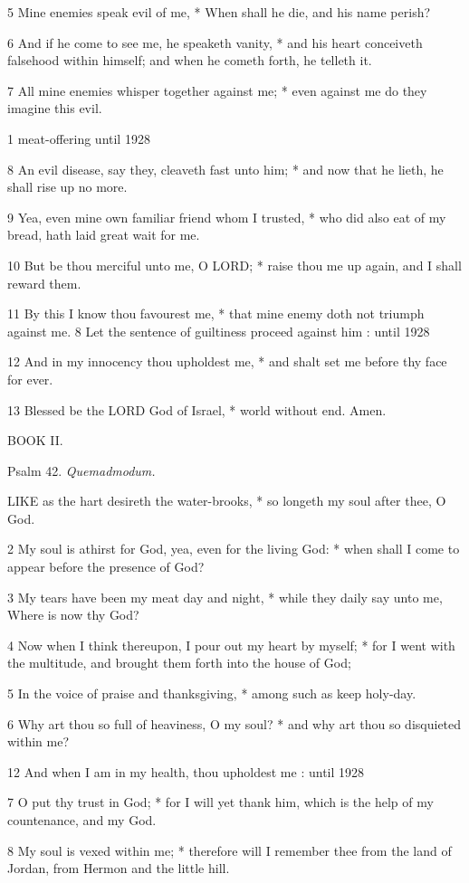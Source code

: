 5 Mine enemies speak evil of me, * When shall he die,
and his name perish?

6 And if he come to see me, he speaketh vanity, * and
his heart conceiveth falsehood within himself; and when he cometh forth,
he telleth it.

7 All mine enemies whisper together against me; * even
against me do they imagine this evil.

1 meat-offering until
1928

8 An evil disease, say they, cleaveth fast unto him;
* and now that he lieth, he shall rise up no more.

9 Yea, even mine own familiar friend whom I trusted,
* who did also eat of my bread, hath laid great wait for me.

10 But be thou merciful unto me, O LORD;
* raise thou me up again, and I shall reward them.

11 By this I know thou favourest me, * that mine enemy
doth not triumph against me. 8 Let the sentence of guiltiness
proceed against him : until
1928

12 And in my innocency thou upholdest me, * and shalt
set me before thy face for ever.

13
Blessed be the LORD God of Israel, * world without
end. Amen.

BOOK
II.

Psalm
42. \emph{Quemadmodum.}

LIKE
as the hart desireth the water-brooks, * so longeth my soul after thee,
O God.

2 My soul is athirst for God, yea, even for the living
God: * when shall I come to appear before the presence of God?

3 My tears have been my meat day and night, * while
they daily say unto me, Where is now thy God?

4 Now when I think thereupon, I pour out my heart by
myself; * for I went with the multitude, and brought them forth into the
house of God;

5 In the voice of praise and thanksgiving, * among
such as keep holy-day.

6 Why art thou so full of heaviness, O my soul? * and
why art thou so disquieted within me?

12 And when I am in my health,
thou upholdest me : until
1928

7
O put thy trust in God; * for I will yet thank him, which is the help
of my countenance, and my God.

8
My soul is vexed within me; * therefore will I remember thee from the
land of Jordan, from Hermon and the little hill.

